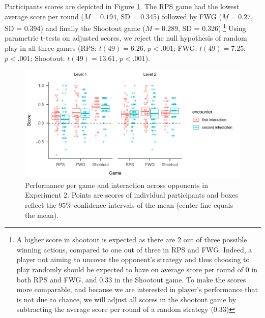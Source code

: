 \documentclass[man,floatsintext]{apa6}
\begin{document}
Participants scores are depicted in Figure \ref{fig:exp2-score-by-opp}. The RPS game had the lowest average score per round (\(M = 0.194\), SD = 0.345) followed by FWG (\(M = 0.27\), SD = 0.394) and finally the Shootout game (\(M = 0.289\), SD = 0.326).\footnote{A higher score in shootout is expected as there are 2 out of three possible winning actions, compared to one out of three in RPS and FWG. Indeed, a player not aiming to uncover the opponent's strategy and thus choosing to play randomly should be expected to have on average score per round of 0 in both RPS and FWG, and 0.33 in the Shootout game. To make the scores more comparable, and because we are interested in player's performance that is not due to chance, we will adjust all scores in the shootout game by subtracting the average score per round of a random strategy (0.33)} Using parametric t-tests on adjusted scores, we reject the null hypothesis of random play in all three games (RPS: \(t(49) = 6.26\), \(p < .001\); FWG: \(t(49) = 7.25\), \(p < .001\); Shootout: \(t(49) = 13.61\), \(p < .001\)).

\begin{figure}

{\centering \includegraphics{paper_draft_2021_files/figure-latex/exp2-score-by-opp-1} 

}

\caption{\label{fig:exp2-score-by-opp}Performance per game and interaction across opponents in Experiment 2. Points are scores of individual participants and boxes reflect the 95\% confidence intervals of the mean (center line equals the mean).}\label{fig:exp2-score-by-opp}
\end{figure}
\end{document}
